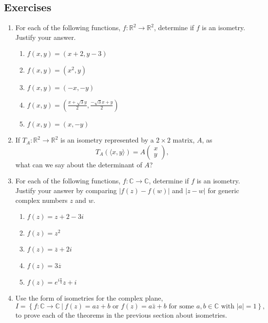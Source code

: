 \documentclass[
]{book}
\providecommand{\tightlist}{%
  \setlength{\itemsep}{0pt}\setlength{\parskip}{0pt}}
\theoremstyle{definition}
\theoremstyle{definition}
\theoremstyle{definition}
\theoremstyle{definition}
\theoremstyle{remark}
\begin{document}
\hypertarget{exercises-51}{%
\subsection{Exercises}\label{exercises-51}}

\begin{enumerate}
\def\labelenumi{\arabic{enumi}.}
\item
  For each of the following functions, \(f:\mathbb{R}^2 \rightarrow \mathbb{R}^2\), determine if \(f\) is an isometry. Justify your answer.

  \begin{enumerate}
  \def\labelenumii{\alph{enumii}.}
  \tightlist
  \item
    \(f(x,y)= (x+2,y-3)\)
  \item
    \(f(x,y)=(x^2,y)\)
  \item
    \(f(x,y)=(-x,-y)\)
  \item
    \(\displaystyle{f(x,y)=\left( \frac{x+\sqrt{3}y}{2}, \frac{-\sqrt{3}x+y}{2}\right) }\)
  \item
    \(f(x,y)=(x,-y)\)
  \end{enumerate}
\item
  If \(T_A:\mathbb{R}^2\rightarrow \mathbb{R}^2\) is an isometry represented by a \(2\times 2\) matrix, \(A\), as \[T_A\left(\langle x,y\rangle \right) = A\begin{pmatrix} x \\ y \end{pmatrix},\] what can we say about the determinant of \(A\)?
\item
  For each of the following functions, \(f:\mathbb{C} \rightarrow \mathbb{C}\), determine if \(f\) is an isometry. Justify your answer by comparing \(|f(z)-f(w)|\) and \(|z-w|\) for generic complex numbers \(z\) and \(w\).

  \begin{enumerate}
  \def\labelenumii{\alph{enumii}.}
  \tightlist
  \item
    \(f(z)=z+2-3i\)
  \item
    \(f(z)=z^2\)
  \item
    \(f(z) = \overline{z}+2i\)
  \item
    \(f(z)= 3 \overline{z}\)
  \item
    \(\displaystyle{f(z)= e^{i\frac{\pi}{4}} z +i}\)
  \end{enumerate}
\item
  Use the form of isometries for the complex plane, \[I = \left\{ f: \mathbb{C} \rightarrow \mathbb{C} \:\vert \: f(z)=a z+b \mbox{ or } f(z)=a \bar{z}+b \mbox{ for some } a, b \in \mathbb{C} \mbox{ with } |a|=1 \right\},\]
  to prove each of the theorems in the previous section about isometries.


\end{enumerate}
\end{document}
